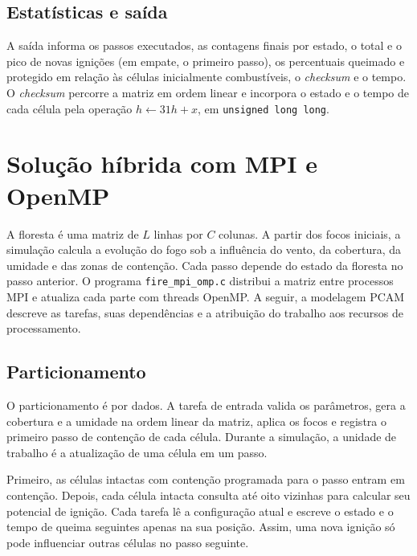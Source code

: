 \documentclass[11pt,a4paper]{article}
\begin{document}
\subsection{Estatísticas e saída}

A saída informa os passos executados, as contagens finais por estado, o
total e o pico de novas ignições (em empate, o primeiro passo), os
percentuais queimado e protegido em relação às células inicialmente
combustíveis, o \emph{checksum} e o tempo. O \emph{checksum} percorre a
matriz em ordem linear e incorpora o estado e o tempo de cada célula pela
operação $h\leftarrow 31h+x$, em \texttt{unsigned long long}.

\section{Solução híbrida com MPI e OpenMP}
\label{sec:pcam}
A floresta é uma matriz de $L$ linhas por $C$ colunas. A partir dos focos
iniciais, a simulação calcula a evolução do fogo sob a influência do vento, da
cobertura, da umidade e das zonas de contenção. Cada passo depende do estado
da floresta no passo anterior. O programa \texttt{fire\_mpi\_omp.c} distribui
a matriz entre processos MPI e atualiza cada parte com threads OpenMP.
A seguir, a modelagem PCAM descreve as tarefas, suas dependências e a
atribuição do trabalho aos recursos de processamento.

\subsection{Particionamento}
O particionamento é por dados. A tarefa de entrada valida os parâmetros,
gera a cobertura e a umidade na ordem linear da matriz, aplica os focos
e registra o primeiro passo de contenção de cada célula. Durante a simulação,
a unidade de trabalho é a atualização de uma célula em um passo.

Primeiro, as células intactas com contenção programada para o passo entram
em contenção. Depois, cada célula intacta consulta até oito vizinhas para
calcular seu potencial de ignição. Cada tarefa lê a configuração atual e
escreve o estado e o tempo de queima seguintes apenas na sua posição.
Assim, uma nova ignição só pode influenciar outras células no passo seguinte.
\end{document}

